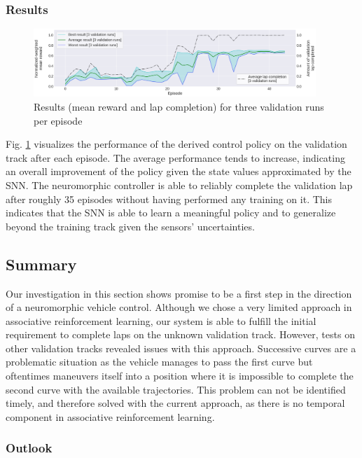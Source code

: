 \subsubsection{Results}%
\label{ssubsec:results}

\begin{figure}[t!]
\centering
  \includegraphics[width=0.95\textwidth]{imgs/CG1-val-updated.eps}
\caption{Results (mean reward and lap completion) for three validation runs per episode \label{fig:results}}
\end{figure}
Fig. \ref{fig:results} visualizes the performance of the derived control policy on the validation track after each episode.
The average performance tends to increase, indicating an overall improvement of the policy given the state values approximated by the \ac{SNN}.
The neuromorphic controller is able to reliably complete the validation lap after roughly \num{35} episodes without having performed any training on it.
This indicates that the \ac{SNN} is able to learn a meaningful policy and to generalize beyond the training track given the sensors' uncertainties.

\subsection{Summary}%
\label{subsec:summary_vehicle_control}

Our investigation in this section shows promise to be a first step in the direction of a neuromorphic vehicle control.
Although we chose a very limited approach in associative reinforcement learning, our system is able to fulfill the initial requirement to complete laps on the unknown validation track.
However, tests on other validation tracks revealed issues with this approach.
Successive curves are a problematic situation as the vehicle manages to pass the first curve but oftentimes maneuvers itself into a position where it is impossible to complete the second curve with the available trajectories.
This problem can not be identified timely, and therefore solved with the current approach, as there is no temporal component in associative reinforcement learning. 

\subsubsection{Outlook}%
\label{ssubsec:outlook}


